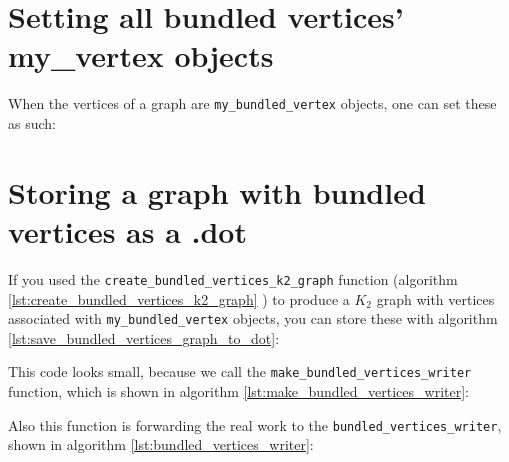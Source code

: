 

\section{Setting all bundled vertices' my\_vertex objects}
\label{subsec:set_bundled_vertex_my_vertexes}

When the vertices of a graph are \verb;my_bundled_vertex; objects, one can set
these as such:



\section{Storing a graph with bundled vertices as a .dot}
\label{subsec:save_bundled_vertices_graph_to_dot}

If you used the \verb;create_bundled_vertices_k2_graph; function (algorithm 
\ref{lst:create_bundled_vertices_k2_graph}
) to produce a $K_{2}$ graph with vertices associated with 
\verb;my_bundled_vertex; objects, you can store these with algorithm 
\ref{lst:save_bundled_vertices_graph_to_dot}:



This code looks small, because we call the \verb;make_bundled_vertices_writer;
function, which is shown in algorithm 
\ref{lst:make_bundled_vertices_writer}:



Also this function is forwarding the real work to 
the \verb;bundled_vertices_writer;, shown in algorithm 
\ref{lst:bundled_vertices_writer}:

